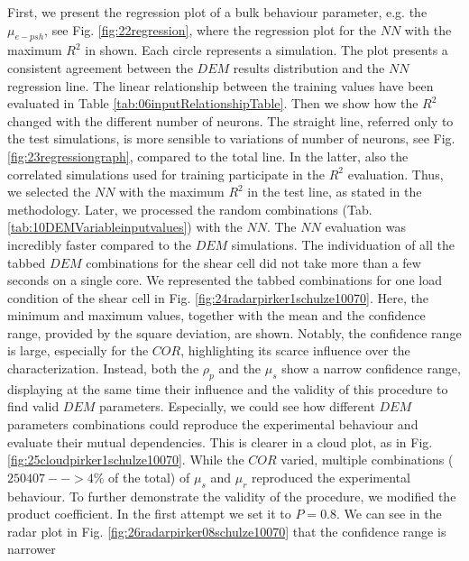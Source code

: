 First, we present the regression plot of a bulk behaviour parameter, e.g. the
$\mu_{e-psh}$, see Fig. \ref{fig:22regression}, where the regression plot for
the $NN$ with the maximum $R^2$ in shown. Each circle represents a simulation. 
The plot presents a consistent agreement between the $DEM$ results distribution and the $NN$ regression line.
% 
The linear relationship between the
training values have been evaluated in Table \ref{tab:06inputRelationshipTable}.
% 
Then we show how the $R^2$ changed with the different number of neurons. The
straight line, referred only to the test simulations, is more sensible to
variations of number of neurons, see Fig. \ref{fig:23regressiongraph}, compared
to the total line. In the latter, also the correlated simulations used for
training participate in the $R^2$ evaluation.
% 
Thus, we selected the $NN$ with the maximum $R^2$ in the test line, as stated in the methodology.
Later, we processed the random combinations (Tab.
\ref{tab:10DEMVariableinputvalues}) with the $NN$.
The $NN$ evaluation was incredibly faster compared to the $DEM$ simulations. The
individuation of all the tabbed $DEM$ combinations for the shear cell did not take more than a few seconds on a single core. 
We represented the tabbed combinations for one load condition of the shear cell in Fig.
\ref{fig:24radarpirker1schulze10070}.
% 
Here, the minimum and maximum values, together with the mean and the confidence
range, provided by the square deviation, are shown. Notably, the confidence range is large, 
especially for the $COR$, highlighting its scarce influence over the characterization. 
Instead, both the $\rho_p$  and the $\mu_s$ show a narrow confidence range, 
displaying at the same time their influence and the validity of this procedure to find valid $DEM$ parameters. 
Especially, we could see how different $DEM$ parameters combinations could reproduce the experimental 
behaviour and evaluate their mutual dependencies. 
This is clearer in a cloud plot, as in Fig. 
\ref{fig:25cloudpirker1schulze10070}. While the $COR$ varied, multiple
combinations ($250407 --> 4\% $ of the total) of $\mu_s$ and $\mu_r$ reproduced
the experimental behaviour.
To further demonstrate the validity of the procedure, we modified the product
coefficient. In the first attempt we set it to $P=0.8$. We can see in the radar plot in Fig. 
\ref{fig:26radarpirker08schulze10070} that the confidence range is narrower
